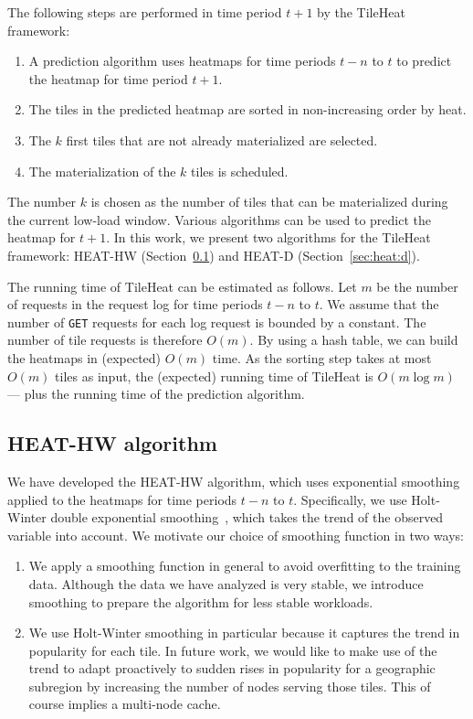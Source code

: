 \documentclass[11pt, oneside]{report}
\begin{document}
{The following steps are performed in time period $t+1$ by the TileHeat framework:
%
\begin{enumerate}
\item A prediction algorithm uses heatmaps for time periods $t-n$ to $t$ to predict the heatmap for time period $t+1$.
\item The tiles in the predicted heatmap are sorted in non-increasing order by heat.
\item The $k$ first tiles that are not already materialized are selected.
\item The materialization of the $k$ tiles is scheduled.
\end{enumerate}

The number $k$ is chosen as the number of tiles that can be materialized during the current low-load window. Various algorithms can be used to predict the heatmap for $t + 1$. In this work, we present two algorithms for the TileHeat framework: HEAT-HW (Section~\ref{sec:heat:hw}) and HEAT-D (Section~\ref{sec:heat:d}).

The running time of TileHeat can be estimated as follows. Let $m$ be the number of requests in the request log for time periods $t-n$ to $t$. We assume that the number of \texttt{GET} requests for each log request is bounded by a constant. The number of tile requests is therefore $O(m)$. By using a hash table, we can build the heatmaps in (expected) $O(m)$ time. As the sorting step takes at most $O(m)$ tiles as input, the (expected) running time of TileHeat is $O(m \log m)$ --- plus the running time of the prediction algorithm. 

\subsection{HEAT-HW algorithm}
\label{sec:heat:hw}
We have developed the HEAT-HW algorithm, which uses exponential smoothing applied to the heatmaps for time periods $t-n$ to $t$. Specifically, we use Holt-Winter double exponential smoothing~\cite{chatfield88}, which takes the trend of the observed variable into account. We motivate our choice of smoothing function in two ways:

\begin{enumerate}
\item We apply a smoothing function in general to avoid overfitting to the training data. Although the data we have analyzed is very stable, we introduce smoothing to prepare the algorithm for less stable workloads.
\item We use Holt-Winter smoothing in particular because it captures the trend in popularity for each tile. In future work, we would like to make use of the trend to adapt proactively to sudden rises in popularity for a geographic subregion by increasing the number of nodes serving those tiles. This of course implies a multi-node cache.
\end{enumerate}

}
\end{document}
